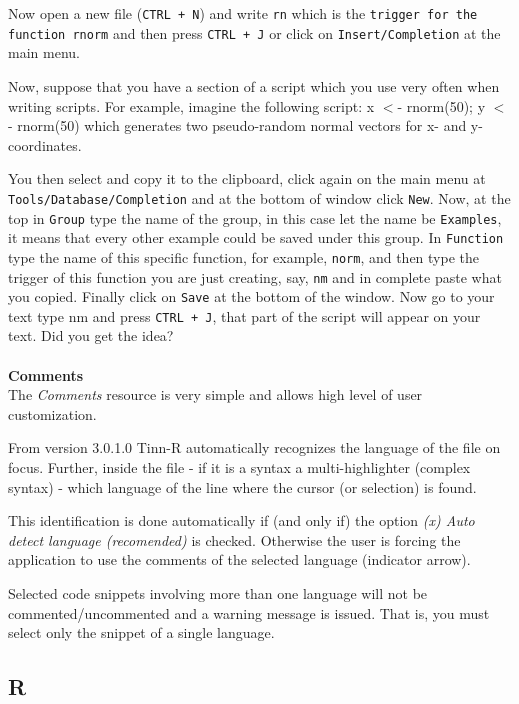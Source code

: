 Now open a new file (\texttt{CTRL + N}) and write \texttt{rn} which is the \texttt{trigger for the function rnorm}
and then press \texttt{CTRL + J} or click on \texttt{Insert/Completion} at the main menu.

Now, suppose that you have a section of a script which you use very often when writing scripts.
For example, imagine the following script: x $<$- rnorm(50); y $<$- rnorm(50) which generates
two pseudo-random normal vectors for x- and y-coordinates.

You then select and copy it to the clipboard, click again on the main menu at
\texttt{Tools/Database/Completion} and at the bottom of window click \texttt{New}.
Now, at the top in \texttt{Group} type the name of the group, in this case let the name be \texttt{Examples},
it means that every other example could be saved under this group. In \texttt{Function} type the name of this
specific function, for example, \texttt{norm}, and then type the trigger of this function you are just creating,
say, \texttt{nm} and in complete paste what you copied. Finally click on \texttt{Save} at the bottom of the window.
Now go to your text type nm and press \texttt{CTRL + J},
that part of the script will appear on your text. Did you get the idea?

\paragraph{}\textbf{Comments}\\
The \textit{Comments} resource is very simple and allows high level
of user customization.

From version 3.0.1.0 Tinn-R automatically recognizes the
language of the file on focus. Further, inside the file
- if it is a syntax a multi-highlighter (complex syntax) - which language of
the line where the cursor (or selection) is found.

This identification is done automatically if (and only if) the option
\textit{(x) Auto detect language (recomended)} is checked. Otherwise
the user is forcing the application to use the comments of the selected language
(indicator arrow).

Selected code snippets involving more than one language will not be commented/uncommented
and a warning message is issued. That is, you must select only the snippet of a single language.

\newpage
\subsection{R}


